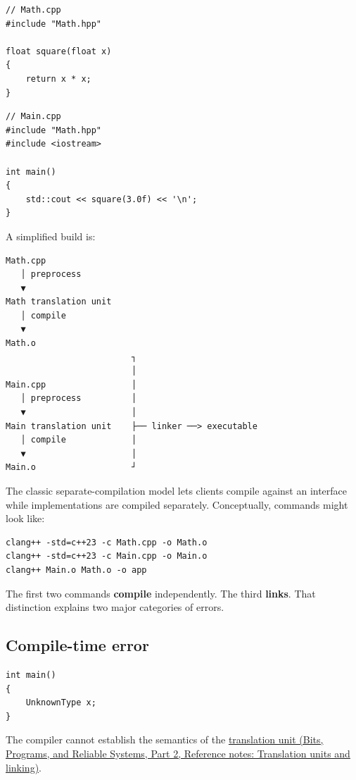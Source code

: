 \begin{verbatim}
// Math.cpp
#include "Math.hpp"

float square(float x)
{
    return x * x;
}
\end{verbatim}

\begin{verbatim}
// Main.cpp
#include "Math.hpp"
#include <iostream>

int main()
{
    std::cout << square(3.0f) << '\n';
}
\end{verbatim}

A simplified build is:

\begin{verbatim}
Math.cpp
   │ preprocess
   ▼
Math translation unit
   │ compile
   ▼
Math.o
                         ┐
                         │
Main.cpp                 │
   │ preprocess          │
   ▼                     │
Main translation unit    ├── linker ──> executable
   │ compile             │
   ▼                     │
Main.o                   ┘
\end{verbatim}

The classic separate-compilation model lets clients compile against an interface while implementations are compiled separately. Conceptually, commands might look like:

\begin{verbatim}
clang++ -std=c++23 -c Math.cpp -o Math.o
clang++ -std=c++23 -c Main.cpp -o Main.o
clang++ Main.o Math.o -o app
\end{verbatim}

The first two commands \textbf{compile} independently. The third \textbf{links}. That distinction explains two major categories of errors.

\subsection{Compile-time error}\label{05-engine-i-ch002-compile-time-error}

\hypertarget{05-engine-i-ch002-compile-time-error}{}

\begin{verbatim}
int main()
{
    UnknownType x;
}
\end{verbatim}

The compiler cannot establish the semantics of the \href{../01-Bits-Programs-and-Reliable-Systems-P02/main.pdf\#appendix-806686359e1b}{translation unit (Bits, Programs, and Reliable Systems, Part 2, Reference notes: Translation units and linking)}.

